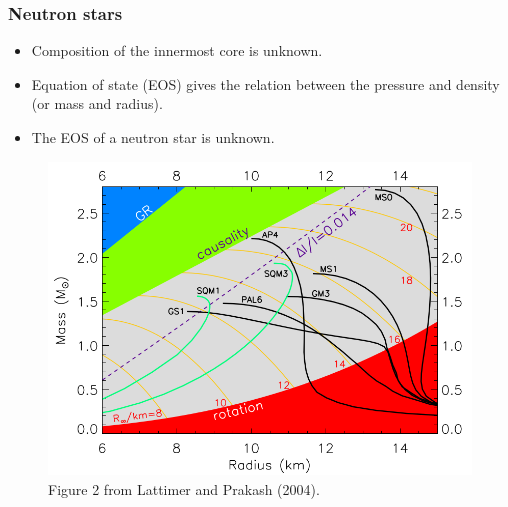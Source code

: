 \documentclass{beamer}
\begin{document}

\begin{frame}
\frametitle{Neutron stars}
\begin{minipage}{0.5\textwidth}
\begin{itemize}
\item Composition of the innermost core is unknown.
\item Equation of state (EOS) gives the relation between the pressure and density (or mass and radius).
\item The EOS of a neutron star is unknown.
\end{itemize}
\end{minipage}%
\begin{minipage}{.5\textwidth}
\begin{figure}
\includegraphics[width=1.1\linewidth]{eos_mr.png}
\caption{Figure 2 from Lattimer and Prakash (2004).}
\end{figure}
\end{minipage}
\end{frame}




\end{document}
